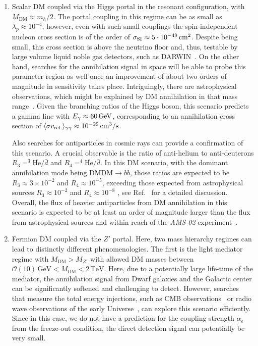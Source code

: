 \documentclass[aps,prd,twocolumn,preprintnumbers,superscriptaddress,nobibnotes,floatfix,longbibliography]{revtex4-1}
\newcommand{\MDM}{M_{\text{DM}}}
\begin{document}
\begin{enumerate}
\item Scalar DM coupled via the Higgs portal in the resonant configuration, with $\MDM \approx m_h/2$. The portal coupling in this regime can be as small as $\lambda_p \approx 10^{-4}$, however, even with such small couplings the spin-independent nucleon cross section is of the order of $\sigma_{\rm SI} \approx 5 \cdot 10^{-49} \, \text{cm}^2$. Despite being small, this cross section is above the neutrino floor and, thus, testable by large volume liquid noble gas detectors, such as DARWIN~\cite{1606.07001}. On the other hand, searches for the annihilation signal in space will be able to probe this parameter region as well once an improvement of about two orders of magnitude in sensitivity takes place. Intriguingly, there are astrophysical observations, which might be explained by DM annihilation in that mass range~\cite{1510.07562,1904.08430,2001.08749}. Given the branching ratios of the Higgs boson, this scenario predicts a gamma line with $E_\gamma \approx 60 \, \rm GeV$, corresponding to an annihilation cross section of $\langle \sigma v_{\rm rel.} \rangle_{\gamma \gamma} \approx 10^{-29} \,\text{cm}^3/\text{s}$.

Also searches for antiparticles in cosmic rays can provide a confirmation of this scenario. A crucial observable is the ratio of anti-helium to anti-deuterons $R_3 = ^3\!\!\overline{\text{He}}/\bar{d}$ and  $R_4 = ^4\!\!\overline{\text{He}}/\bar{d}$. In this DM scenario, with the dominant annihilation mode being $\text{DM} \text{DM} \rightarrow b \bar{b}$, those ratios are expected to be $R_3 \approx 3 \times10^{-2}$ and $R_4 \approx 10^{-5}$, exceeding those expected from astrophysical sources $R_3 \approx 10^{-2}$ and $R_4 \approx 10^{-8}$ , see Ref.~\cite{2001.08749} for a detailed discussion. Overall, the flux of heavier antiparticles from DM annihilation in this scenario is expected to be at least an order of magnitude larger than the flux from astrophysical sources and within reach of the \textit{AMS-02}  experiment~\cite{Aguilar:2016kjl}.

\item Fermion DM coupled via the $Z'$ portal.  Here, two mass hierarchy regimes can lead to distinctly different phenomenologies. The first is the light mediator regime with $\MDM > M_{Z'}$ with allowed DM masses between $\mathcal{O}(10)\,\text{GeV} < \MDM < 2 \,\text{TeV}$. Here, due to a potentially large life-time of the mediator, the annihilation signal from Dwarf galaxies and the Galactic center can be significantly softened and challenging to detect. However, searches that measure the total energy injections, such as CMB observations~\cite{0906.1197} or radio wave observations of the early Universe~\cite{1803.03629}, can explore this scenario efficiently.  Since in this case, we do not have a prediction for the coupling strength $\alpha_\epsilon$ from the freeze-out condition, the direct detection signal can potentially be very small.


\end{enumerate}
\end{document}
